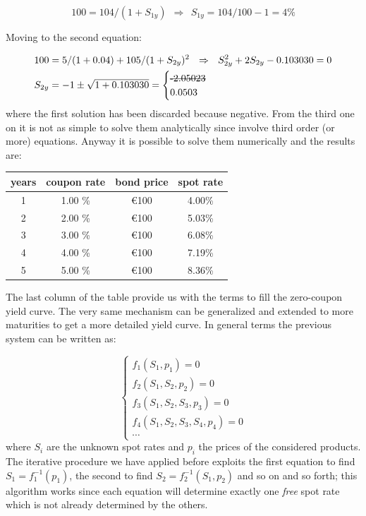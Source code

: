 \[100 = 104 / (1 + S_{1y})~~\Rightarrow~~S_{1y} = 104/100 - 1 = 4\% \]

Moving to the second equation:

\begin{equation*}
\begin{split}
& 100 = 5 / (1 + 0.04) + 105 / (1 + S_{2y})^{2}~~\Rightarrow~~S_{2y}^2  + 2 S_{2y}  - 0.103030 = 0 \\
& S_{2y} = - 1 \pm \sqrt{1 + 0.103030} = \begin{cases}\text{\sout{-2.05023}} \\ 0.0503\end{cases}
\end{split}
\end{equation*}
where the first solution has been discarded because negative.
From the third one on it is not as simple to solve them analytically since involve third order (or more) equations. Anyway it is possible to solve them numerically and the results are:

\begin{table}[htp]
\begin{center}
\begin{tabular}{|c|c|c|c|}
\hline
\textbf{years} & \textbf{coupon rate} & \textbf{bond price} & \textbf{spot rate} \\
\hline
1 & 1.00 \% & \euro{100} & 4.00\% \\
\hline
2 & 2.00 \% & \euro{100} & 5.03\% \\
\hline
3 & 3.00 \% & \euro{100} & 6.08\% \\
\hline
4 & 4.00 \% & \euro{100} & 7.19\% \\
\hline
5 & 5.00 \% & \euro{100} & 8.36\% \\
\hline
\end{tabular}
\end{center}
\label{default}
\end{table}

The last column of the table provide us with the terms to fill the zero-coupon yield curve.
The very same mechanism can be generalized and extended to more maturities to get a more detailed yield curve. In general terms the previous system can be written as:

\begin{equation*}
\begin{cases}
f_1(S_1, p_1) = 0 \\
f_2(S_1, S_2, p_2) = 0 \\
f_3(S_1, S_2, S_3, p_3) = 0 \\
f_4(S_1, S_2, S_3, S_4, p_4) = 0 \\
\cdots
\end{cases}
\end{equation*}
where $S_i$ are the unknown spot rates and $p_i$ the prices of the considered products. The iterative procedure we have applied before exploits the first equation to find $S_1 = f_1^{-1}(p_1)$, the second to find $S_2 = f_2^{-1}(S_1, p_2)$ and so on and so forth; this algorithm works since each equation will determine exactly one \emph{free} spot rate which is not already determined by the others.

